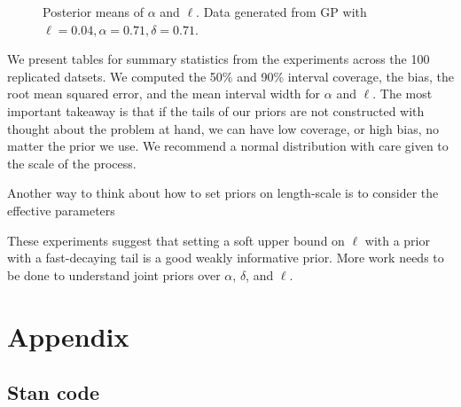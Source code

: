 \documentclass{article}
\begin{document}
\begin{figure}[h]
  \centering
  \caption{Posterior means of $\alpha$ and $\ell$. Data generated from GP with $\ell = 0.04, \alpha = 0.71, \delta = 0.71$.} \label{joint_len_alpha_high_SN}
\end{figure}

We present tables for summary statistics from the experiments across the 100
replicated datsets. We computed the 50\% and 90\% interval coverage, the bias,
the root mean squared error, and the mean interval width for $\alpha$ and
$\ell$. The most important takeaway is that if the tails of our priors are not
constructed with thought about the problem at hand, we can have low coverage,
or high bias, no matter the prior we use. We recommend a normal distribution
with care given to the scale of the process.

Another way to think about how to set priors on length-scale is to consider
the effective parameters 

These experiments suggest that setting a soft upper bound on $\ell$ with a
prior with a fast-decaying tail is a good weakly informative prior. More work
needs to be done to understand joint priors over $\alpha$, $\delta$, and
$\ell$.

\pagebreak

\section{Appendix}

\subsection{Stan code}
\end{document}
